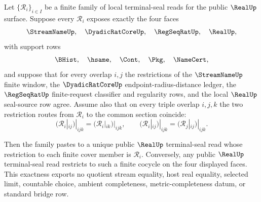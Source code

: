 \begin{theorem}
\label{thm:real-terminal-seal-finite-cover-cocycle-exactness}
Let $\{\mathcal R_i\}_{i\in I}$ be a finite family of local terminal-seal
reads for the public $\RealUp$ surface. Suppose every $\mathcal R_i$ exposes
exactly the four faces
$$
\StreamNameUp,\quad \DyadicRatCoreUp,\quad \RegSeqRatUp,\quad \RealUp,
$$
with support rows
$$
\BHist,\quad \hsame,\quad \Cont,\quad \Pkg,\quad \NameCert,
$$
and suppose that for every overlap $i,j$ the restrictions of the
$\StreamNameUp$ finite window, the $\DyadicRatCoreUp$
endpoint-radius-distance ledger, the $\RegSeqRatUp$ finite-request classifier
and regularity rows, and the local $\RealUp$ seal-source row agree. Assume
also that on every triple overlap $i,j,k$ the two restriction routes from
$\mathcal R_i$ to the common section coincide:
$$
(\mathcal R_i|_{ij})|_{ijk}=(\mathcal R_i|_{ik})|_{ijk},
\qquad
(\mathcal R_i|_{ij})|_{ijk}=(\mathcal R_j|_{ij})|_{ijk}.
$$

Then the family pastes to a unique public $\RealUp$ terminal-seal read whose
restriction to each finite cover member is $\mathcal R_i$. Conversely, any
public $\RealUp$ terminal-seal read restricts to such a finite cocycle on the
four displayed faces. This exactness exports no quotient stream equality, host
real equality, selected limit, countable choice, ambient completeness,
metric-completeness datum, or standard bridge row.
\end{theorem}
